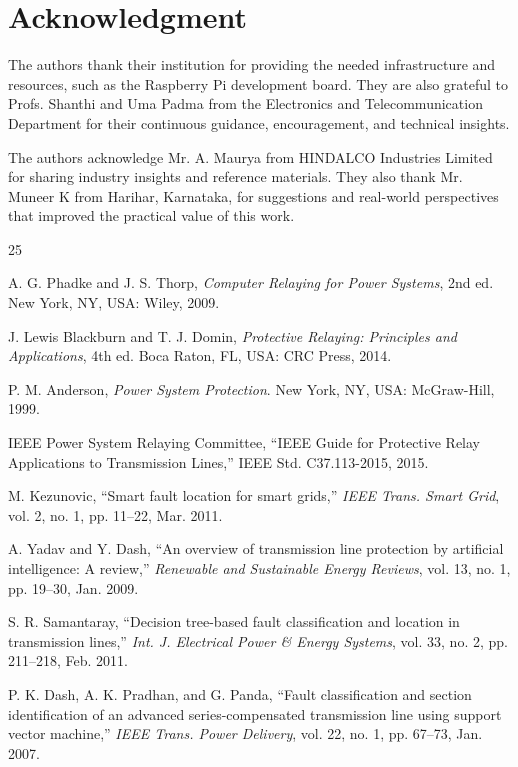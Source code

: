 \documentclass[journal]{IEEEtran}
\begin{document}
\section*{Acknowledgment}
The authors thank their institution for providing the needed infrastructure and resources, such as the Raspberry Pi development board. They are also grateful to Profs. Shanthi and Uma Padma from the Electronics and Telecommunication Department for their continuous guidance, encouragement, and technical insights.

The authors acknowledge Mr. A. Maurya from HINDALCO Industries Limited for sharing industry insights and reference materials. They also thank Mr. Muneer K from Harihar, Karnataka, for suggestions and real-world perspectives that improved the practical value of this work.


\begin{thebibliography}{25}

A. G. Phadke and J. S. Thorp, \emph{Computer Relaying for Power Systems}, 2nd ed. New York, NY, USA: Wiley, 2009.

J. Lewis Blackburn and T. J. Domin, \emph{Protective Relaying: Principles and Applications}, 4th ed. Boca Raton, FL, USA: CRC Press, 2014.

P. M. Anderson, \emph{Power System Protection}. New York, NY, USA: McGraw-Hill, 1999.

IEEE Power System Relaying Committee, ``IEEE Guide for Protective Relay Applications to Transmission Lines,'' IEEE Std. C37.113-2015, 2015.

M. Kezunovic, ``Smart fault location for smart grids,'' \emph{IEEE Trans. Smart Grid}, vol. 2, no. 1, pp. 11--22, Mar. 2011.

A. Yadav and Y. Dash, ``An overview of transmission line protection by artificial intelligence: A review,'' \emph{Renewable and Sustainable Energy Reviews}, vol. 13, no. 1, pp. 19--30, Jan. 2009.

S. R. Samantaray, ``Decision tree-based fault classification and location in transmission lines,'' \emph{Int. J. Electrical Power \& Energy Systems}, vol. 33, no. 2, pp. 211--218, Feb. 2011.

P. K. Dash, A. K. Pradhan, and G. Panda, ``Fault classification and section identification of an advanced series-compensated transmission line using support vector machine,'' \emph{IEEE Trans. Power Delivery}, vol. 22, no. 1, pp. 67--73, Jan. 2007.


\end{thebibliography}
\end{document}
